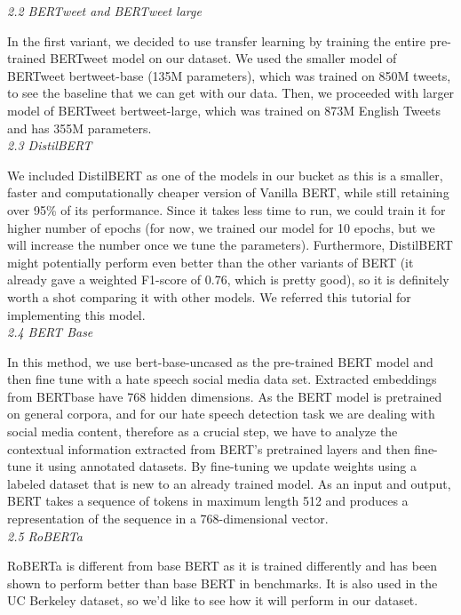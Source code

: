 \documentclass[a4paper, 10pt, conference]{IEEEtran}
\begin{document}
{{{{\noindent\textit{2.2 BERTweet and BERTweet large}

In the first variant, we decided to use transfer learning by training the entire pre-trained BERTweet model on our dataset. We used the smaller model of BERTweet bertweet-base (135M parameters), which was trained on 850M tweets, to see the baseline that we can get with our data. Then, we proceeded with larger model of BERTweet bertweet-large, which was trained on 873M English Tweets and has 355M parameters. \\

\noindent\textit{2.3 DistilBERT}

We included DistilBERT as one of the models in our bucket as this is a smaller, faster and computationally cheaper version of Vanilla BERT, while still retaining over 95\% of its performance. Since it takes less time to run, we could train it for higher number of epochs (for now, we trained our model for 10 epochs, but we will increase the number once we tune the parameters). Furthermore, DistilBERT might potentially perform even better than the other variants of BERT (it already gave a weighted F1-score of 0.76, which is pretty good), so it is definitely worth a shot comparing it with other models. We referred this tutorial for implementing this model.\\

\noindent\textit{2.4 BERT Base}

In this method, we use bert-base-uncased as the pre-trained BERT model and then fine tune with a hate speech social media data set. Extracted embeddings from BERTbase have 768 hidden dimensions. As the BERT model is pretrained on general corpora, and for our hate speech detection task we are dealing with social media content, therefore as a crucial step, we have to analyze the contextual information extracted from BERT’s pretrained layers and then fine-tune it using annotated datasets. By fine-tuning we update weights using a labeled dataset that is new to an already trained model. As an input and output, BERT takes a sequence of tokens in maximum length 512 and produces a representation of the sequence in a 768-dimensional vector. \\

\noindent\textit{2.5 RoBERTa}

RoBERTa is different from base BERT as it is trained differently and has been shown to perform better than base BERT in benchmarks. It is also used in the UC Berkeley dataset, so we'd like to see how it will perform in our dataset.

}}}}
\end{document}
